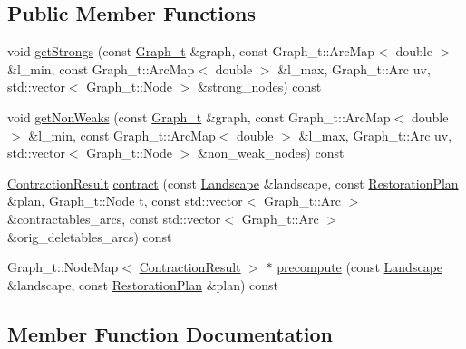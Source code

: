 \subsection*{Public Member Functions}
\begin{DoxyCompactItemize}
\item 
void \hyperlink{class_my_contraction_algorithm_a27a3be7ca9335a48ad08101c045bb883}{get\+Strongs} (const \hyperlink{pl__reff_8cpp_a65aea14f39d53b24df9910d54216d620}{Graph\+\_\+t} \&graph, const Graph\+\_\+t\+::\+Arc\+Map$<$ double $>$ \&l\+\_\+min, const Graph\+\_\+t\+::\+Arc\+Map$<$ double $>$ \&l\+\_\+max, Graph\+\_\+t\+::\+Arc uv, std\+::vector$<$ Graph\+\_\+t\+::\+Node $>$ \&strong\+\_\+nodes) const
\item 
void \hyperlink{class_my_contraction_algorithm_a7163cb16dd44d41e7a1974ed9f367e8a}{get\+Non\+Weaks} (const \hyperlink{pl__reff_8cpp_a65aea14f39d53b24df9910d54216d620}{Graph\+\_\+t} \&graph, const Graph\+\_\+t\+::\+Arc\+Map$<$ double $>$ \&l\+\_\+min, const Graph\+\_\+t\+::\+Arc\+Map$<$ double $>$ \&l\+\_\+max, Graph\+\_\+t\+::\+Arc uv, std\+::vector$<$ Graph\+\_\+t\+::\+Node $>$ \&non\+\_\+weak\+\_\+nodes) const
\item 
\hyperlink{class_contraction_result}{Contraction\+Result} \hyperlink{class_my_contraction_algorithm_ab2d761789cb18c240f5a610a9770ef29}{contract} (const \hyperlink{class_landscape}{Landscape} \&landscape, const \hyperlink{class_restoration_plan}{Restoration\+Plan} \&plan, Graph\+\_\+t\+::\+Node t, const std\+::vector$<$ Graph\+\_\+t\+::\+Arc $>$ \&contractables\+\_\+arcs, const std\+::vector$<$ Graph\+\_\+t\+::\+Arc $>$ \&orig\+\_\+deletables\+\_\+arcs) const
\item 
Graph\+\_\+t\+::\+Node\+Map$<$ \hyperlink{class_contraction_result}{Contraction\+Result} $>$ $\ast$ \hyperlink{class_my_contraction_algorithm_a4583c564e68d337bd9dcef315093bbe6}{precompute} (const \hyperlink{class_landscape}{Landscape} \&landscape, const \hyperlink{class_restoration_plan}{Restoration\+Plan} \&plan) const
\end{DoxyCompactItemize}


\subsection{Member Function Documentation}
\mbox{\label{class_my_contraction_algorithm_ab2d761789cb18c240f5a610a9770ef29}} 
